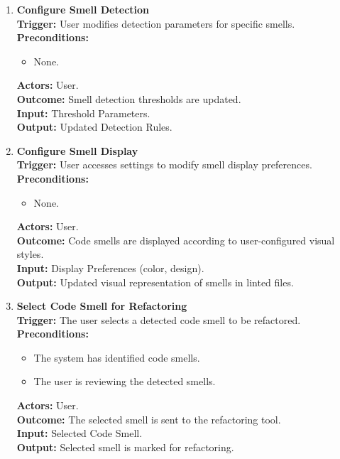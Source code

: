 \documentclass[12pt]{article}
\begin{document}
\begin{enumerate}[label={\bf PUC \arabic*:}, wide=0pt, font=\itshape]
  \item \textbf{Configure Smell Detection} \\[2mm]
    \textbf{Trigger:} User modifies detection parameters for specific
    smells. \\[2mm]
    \textbf{Preconditions:}
    \begin{itemize}
      \item None.
    \end{itemize}
    \textbf{Actors:} User. \\
    \textbf{Outcome:} Smell detection thresholds are updated. \\
    \textbf{Input:} Threshold Parameters. \\
    \textbf{Output:} Updated Detection Rules.

  \item \textbf{Configure Smell Display} \\[2mm]
    \textbf{Trigger:} User accesses settings to modify smell display
    preferences. \\[2mm]
    \textbf{Preconditions:}
    \begin{itemize}
      \item None.
    \end{itemize}
    \textbf{Actors:} User. \\
    \textbf{Outcome:} Code smells are displayed according to
    user-configured visual styles. \\
    \textbf{Input:} Display Preferences (color, design). \\
    \textbf{Output:} Updated visual representation of smells in linted files.
  \item \textbf{Select Code Smell for Refactoring} \\[2mm]
    \textbf{Trigger:} The user selects a detected code smell to be
    refactored. \\[2mm]
    \textbf{Preconditions:}
    \begin{itemize}
      \item The system has identified code smells.
      \item The user is reviewing the detected smells.
    \end{itemize}
    \textbf{Actors:} User. \\
    \textbf{Outcome:} The selected smell is sent to the refactoring tool. \\
    \textbf{Input:} Selected Code Smell. \\
    \textbf{Output:} Selected smell is marked for refactoring.


\end{enumerate}
\end{document}
